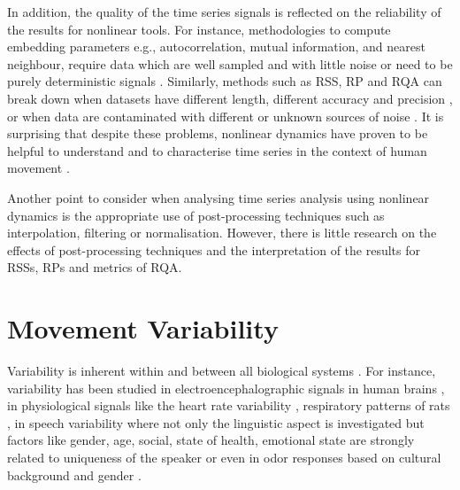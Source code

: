 In addition, the quality of the time series signals is reflected on 
the reliability of the results for nonlinear tools. For instance, 
methodologies to compute embedding 
parameters e.g., autocorrelation, mutual information, and nearest neighbour,
require data which are well sampled and with little noise \citep{garland2016} 
or need to be purely deterministic signals \citep{kantz2003}.
Similarly, methods such as RSS, RP and RQA can break down when 
datasets have different length, different accuracy and 
precision \citep{frank2010},
or when data are contaminated with different or unknown sources of noise 
\citep{garland2016}. It is surprising that despite these problems,
nonlinear dynamics have proven to be helpful to understand and 
to characterise time series in the context of human movement 
\citep{Quintana-Duque2012, Quintana-Duque2016, sama2013, frank2010,
gomezgarcia2014, marwan2011, stergiou2011, bradley2015}.

Another point to consider when analysing time series analysis using 
nonlinear dynamics is the appropriate use of post-processing techniques 
such as interpolation, filtering or normalisation.
However, there is little research on the effects of post-processing 
techniques and the interpretation of the results for RSSs, RPs and 
metrics of RQA.

%






\section{Movement Variability}
Variability is inherent within and between all biological 
systems \citep{newell1993}.
For instance, variability has been studied in electroencephalographic 
signals in human brains \citep{klonowski2007}, in physiological signals 
like the heart rate variability \citep{schumacher2004, acharya2006}, 
respiratory patterns of rats \citep{dhingra2011}, in speech variability 
where not only the linguistic aspect is investigated but 
factors like gender, age, social, state of health, emotional state are
strongly related to uniqueness of the speaker \citep{benzeghiba2007}
or even in odor responses based on cultural background and 
gender \citep{ferdenzi2013}.

